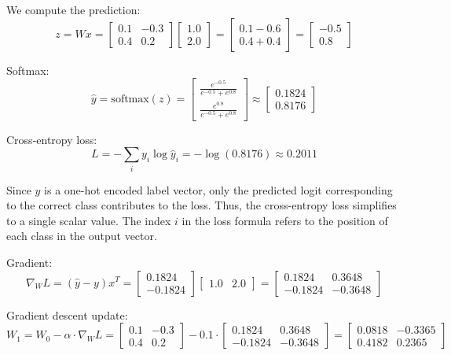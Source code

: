 We compute the prediction:
\[
z = W x = \begin{bmatrix} 0.1 & -0.3 \\ 0.4 & 0.2 \end{bmatrix}
\begin{bmatrix} 1.0 \\ 2.0 \end{bmatrix} =
\begin{bmatrix} 0.1 - 0.6 \\ 0.4 + 0.4 \end{bmatrix} =
\begin{bmatrix} -0.5 \\ 0.8 \end{bmatrix}
\]

Softmax:
\[
\hat{y} = \text{softmax}(z) = 
\begin{bmatrix}
	\frac{e^{-0.5}}{e^{-0.5} + e^{0.8}} \\
	\frac{e^{0.8}}{e^{-0.5} + e^{0.8}}
\end{bmatrix}
\approx
\begin{bmatrix}
	0.1824 \\
	0.8176
\end{bmatrix}
\]

Cross-entropy loss:
\[
L = -\sum_i y_i \log \hat{y}_i = -\log(0.8176) \approx 0.2011
\]

Since $y$ is a one-hot encoded label vector, only the predicted logit corresponding to the correct class contributes to the loss. Thus, the cross-entropy loss simplifies to a single scalar value. The index $i$ in the loss formula refers to the position of each class in the output vector.


Gradient:
\[
\nabla_W L = (\hat{y} - y)x^T = 
\begin{bmatrix}
	0.1824 \\ -0.1824
\end{bmatrix}
\begin{bmatrix} 1.0 & 2.0 \end{bmatrix}
=
\begin{bmatrix}
	0.1824 & 0.3648 \\
	-0.1824 & -0.3648
\end{bmatrix}
\]



Gradient descent update:
\[
W_1 = W_0 - \alpha \cdot \nabla_W L =
\begin{bmatrix} 0.1 & -0.3 \\ 0.4 & 0.2 \end{bmatrix}
-
0.1 \cdot
\begin{bmatrix}
	0.1824 & 0.3648 \\
	-0.1824 & -0.3648
\end{bmatrix}
=
\begin{bmatrix}
	0.0818 & -0.3365 \\
	0.4182 & 0.2365
\end{bmatrix}
\]

